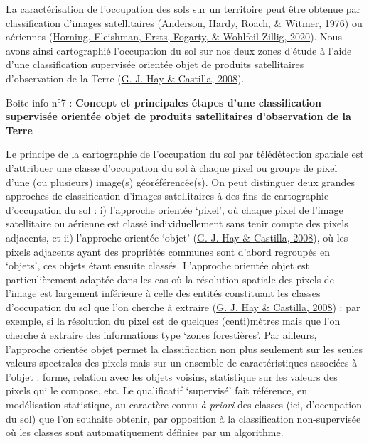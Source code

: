 \documentclass[12pt,twoside]{reedthesis}
\begin{document}
La caractérisation de l'occupation des sols sur un territoire peut être obtenue par classification d'images satellitaires (\protect\hyperlink{ref-anderson_land_1976}{Anderson, Hardy, Roach, \& Witmer, 1976}) ou aériennes (\protect\hyperlink{ref-horning_mapping_2020}{Horning, Fleishman, Ersts, Fogarty, \& Wohlfeil Zillig, 2020}). Nous avons ainsi cartographié l'occupation du sol sur nos deux zones d'étude à l'aide d'une classification supervisée orientée objet de produits satellitaires d'observation de la Terre (\protect\hyperlink{ref-blaschke_geographic_2008}{G. J. Hay \& Castilla, 2008}).\\
\begin{lightcyanbox}
\begin{center}
Boite info n°7 : \textbf{Concept et principales étapes d'une classification supervisée orientée objet de produits satellitaires d'observation de la Terre}

\end{center}
Le principe de la cartographie de l'occupation du sol par télédétection spatiale est d'attribuer une classe d'occupation du sol à chaque pixel ou groupe de pixel d'une (ou plusieurs) image(s) géoréférencée(s). On peut distinguer deux grandes approches de classification d'images satellitaires à des fins de cartographie d'occupation du sol : i) l'approche orientée `pixel', où chaque pixel de l'image satellitaire ou aérienne est classé individuellement sans tenir compte des pixels adjacents, et ii) l'approche orientée `objet' (\protect\hyperlink{ref-blaschke_geographic_2008}{G. J. Hay \& Castilla, 2008}), où les pixels adjacents ayant des propriétés communes sont d'abord regroupés en `objets', ces objets étant ensuite classés. L'approche orientée objet est particulièrement adaptée dans les cas où la résolution spatiale des pixels de l'image est largement inférieure à celle des entités constituant les classes d'occupation du sol que l'on cherche à extraire (\protect\hyperlink{ref-blaschke_geographic_2008}{G. J. Hay \& Castilla, 2008}) : par exemple, si la résolution du pixel est de quelques (centi)mètres mais que l'on cherche à extraire des informations type `zones forestières'. Par ailleurs, l'approche orientée objet permet la classification non plus seulement sur les seules valeurs spectrales des pixels mais sur un ensemble de caractéristiques associées à l'objet : forme, relation avec les objets voisins, statistique sur les valeurs des pixels qui le compose, etc. Le qualificatif `supervisé' fait référence, en modélisation statistique, au caractère connu \emph{à priori} des classes (ici, d'occupation du sol) que l'on souhaite obtenir, par opposition à la classification non-supervisée où les classes sont automatiquement définies par un algorithme.\\


\end{lightcyanbox}
\end{document}
